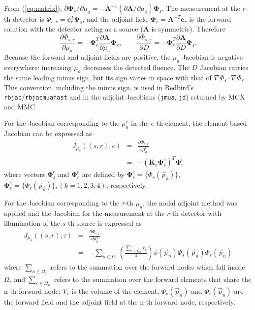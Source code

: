 \documentclass[12pt]{book}               %
\begin{document}
From (\ref{eq:matrix}), $\partial{\boldsymbol\Phi}_s/\partial\mu_a=-\mathbf{A}^{-1}\left(\partial\mathbf{A}/\partial\mu_a\right){\boldsymbol\Phi}_s$.
The measurement at the $r$-th detector is $\Phi_{s,r}=\mathbf{e}_r^T{\boldsymbol\Phi}_s$, and the adjoint field
${\boldsymbol\Phi}_r=\mathbf{A}^{-T}\mathbf{e}_r$ is the forward solution with the detector acting as a source
($\mathbf{A}$ is symmetric). Therefore
\begin{equation}
\frac{\partial\Phi_{s,r}}{\partial\mu_a}=-{\boldsymbol\Phi}_r^T\frac{\partial\mathbf{A}}{\partial\mu_a}{\boldsymbol\Phi}_s,
\qquad
\frac{\partial\Phi_{s,r}}{\partial D}=-{\boldsymbol\Phi}_r^T\frac{\partial\mathbf{A}}{\partial D}{\boldsymbol\Phi}_s .
\end{equation}
Because the forward and adjoint fields are positive, the $\mu_a$ Jacobian is negative everywhere:
increasing $\mu_a$ decreases the detected fluence. The $D$ Jacobian carries the same leading minus
sign, but its sign varies in space with that of $\nabla\Phi_s\cdot\nabla\Phi_r$. This convention, including
the minus sign, is used in Redbird's \texttt{rbjac}/\texttt{rbjacmuafast} and in the adjoint Jacobians
(\texttt{jmua}, \texttt{jd}) returned by MCX and MMC.

For the Jacobian corresponding to the $\mu_a^e$ in the $e$-th element, the 
element-based Jacobian can be expressed as
\begin{eqnarray}\nonumber
J_{\mu_a}((s,r),e)&=&\frac{\partial
\Phi_{s,r}}{\partial\mu_a^{e}}\\&=&-\left(\mathbf{K}_e{\boldsymbol\Phi}_s^e\right)^T{\boldsymbol\Phi}_r^e
\end{eqnarray}
where vectors $\boldsymbol{\Phi}_s^e$ and $\boldsymbol{\Phi}_r^e$
are defined by $\boldsymbol{\Phi}_s^e=\{\Phi_s(\vec{p}_k)\}$,
$\boldsymbol{\Phi}_r^e=\{\Phi_r(\vec{p}_k)\}, (k=1,2,3,4)$,
respectively.

For the Jacobian corresponding to the $\tau$-th $\mu_a$, the nodal
adjoint method was applied and the Jacobian for the measurement at
the $r$-th detector with illumination of the $s$-th source is
expressed as
\begin{eqnarray}\nonumber
J_{\mu_a}((s,r),\tau)&=&\frac{\partial
\Phi_{s,r}}{\partial\mu_a^{\tau}}\\&=&-\sum_{n\in\Omega_\tau}\left(\frac{\sum_{e\in\Omega_n}
V_e}{4}\right)\phi(\vec{p}_n)\Phi_s(\vec{p}_n)\Phi_r(\vec{p}_n)
\end{eqnarray}
where $\sum_{n\in\Omega_\tau}$ refers to the summation over the
forward nodes which fall inside $\Omega_\tau$ and
$\sum_{e\in\Omega_n}$ refers to the summation over the forward
elements that share the n-th forward node; $V_e$ is the volume of
the element, $\Phi_s(\vec{p}_n)$ and $\Phi_r(\vec{p}_n)$ are the
forward field and the adjoint field at the n-th forward node,
respectively.
\end{document}
